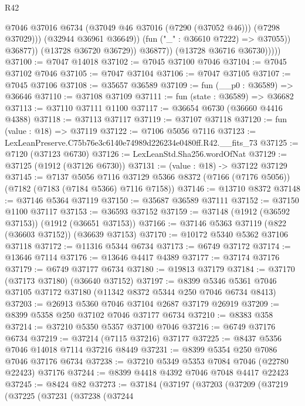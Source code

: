 \begin{lexlean}{R42}
\begin{coremodule}
{                              @7046
                              @37016
                              @6734
                              (@37049 @46 @37016 (@7290 (@37052 @46)))
                              (@7298 @37029)))
                          (@32944 @36961 @36649))
                        (fun ("_" : @36610 @7222) => @37055))
                      @36877))
                  (@13728 @36720 @36729))
                @36877))
            (@13728 @36716 @36730)))))
@37100 := @7047 @14018
@37102 := @7045 @37100 @7046
@37104 := @7045 @37102 @7046
@37105 := @7047 @37104
@37106 := @7047 @37105
@37107 := @7045 @37106
@37108 := @35657 @36589
@37109 := fun (__p0 : @36589) => @36646
@37110 := @37108 @37109
@37111 := fun (state : @36589) => @36682
@37113 := @37110 @37111 @1100
@37117 := @36654 @6730 (@36660 @4416 @4388)
@37118 := @37113 @37117
@37119 := @37107 @37118
@37120 := fun (value : @18) => @37119
@37122 := @7106 @5056 @7116
@37123 := LexLeanPreserve.C75b76e3c6140e74989d226234e0480ff.R42.__fits_73
@37125 := @7120 (@37123 @6730)
@37126 := LexLeanStd.Sha256.wordOfNat
@37129 := @37125 (@1912 (@37126 @6730))
@37131 := (value : @18) -> @37122 @37129
@37145 := @7137
    @5056
    @7116
    @37129
    @5366
    @8372
    (@7166 (@7176 @5056))
    (@7182 (@7183 (@7184 @5366) @7116 @7158))
@37146 := @13710 @8372
@37148 := @37146 @5364 @37119
@37150 := @35687 @36589 @37111
@37152 := @37150 @1100 @37117
@37153 := @36593 @37152
@37159 := @37148 (@1912 (@36592 @37153)) (@1912 (@36651 @37153))
@37166 := @37146 @5363 @37119 (@822 (@36603 @37152)) (@36639 @37153)
@37170 := @10172 @5340 @5362 @37106 @37118
@37172 := @11316 @5344 @6734
@37173 := @6749 @37172
@37174 := @13646 @7114
@37176 := @13646 @4417 @4389
@37177 := @37174 @37176
@37179 := @6749 @37177 @6734
@37180 := @19813 @37179
@37184 := @37170 (@37173 @37180) (@36640 @37152)
@37197 := @8399 @5346 @5361 @7046 @37105 @37172 @37180 (@11342 @8372 @5344 @250 @7046 @6734 @8413)
@37203 := @26913 @5360 @7046 @37104 @2687 @37179 @26919
@37209 := @8399 @5358 @250 @37102 @7046 @37177 @6734
@37210 := @8383 @358
@37214 := @37210 @5350 @5357 @37100 @7046
@37216 := @6749 @37176 @6734
@37219 := @37214 (@7115 @37216) @37177
@37225 := @8437 @5356 @7046 @14018 @7114 @37216 @8449
@37231 := @8399 @5354 @250 @7086 @7046 @37176 @6734
@37238 := @37210 @5349 @5353 @7084 @7046 (@22780 @22423) @37176
@37244 := @8399 @4418 @4392 @7046 @7048 @4417 @22423
@37245 := @8424 @82
@37273 := @37184
    (@37197
      (@37203
        (@37209
          (@37219
            (@37225
              (@37231
                (@37238
                  (@37244
}
\end{coremodule}
\end{lexlean}
